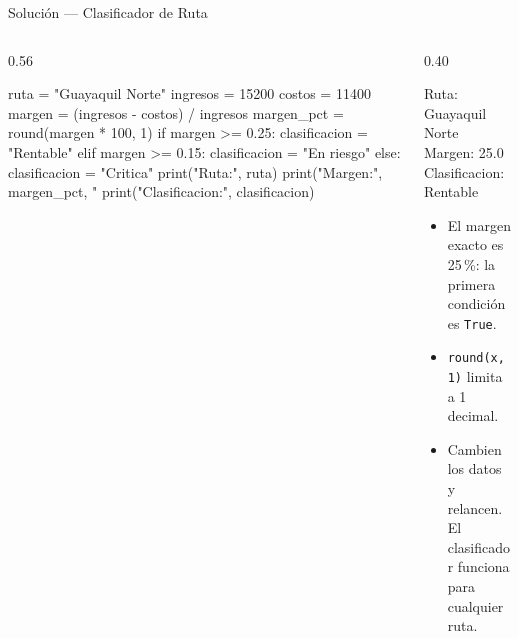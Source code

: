 \documentclass[aspectratio=169, 11pt]{beamer}
\begin{document}
\begin{frame}[fragile,shrink=30]{Solución --- Clasificador de Ruta}
  \vspace{-6pt}
  \begin{columns}[T]
    \begin{column}{0.56\textwidth}
      \begin{pyblock}
ruta     = "Guayaquil Norte"
ingresos = 15200
costos   = 11400
margen     = (ingresos - costos) / ingresos
margen_pct = round(margen * 100, 1)
if margen >= 0.25:
    clasificacion = "Rentable"
elif margen >= 0.15:
    clasificacion = "En riesgo"
else:
    clasificacion = "Critica"
print("Ruta:", ruta)
print("Margen:", margen_pct, "%
print("Clasificacion:", clasificacion)
      \end{pyblock}
    \end{column}

    \begin{column}{0.40\textwidth}
      \vspace{4pt}
      \begin{outputblock}
Ruta: Guayaquil Norte
Margen: 25.0 %
Clasificacion: Rentable
      \end{outputblock}

      \vspace{6pt}
      {\footnotesize\color{textMuted}
      \begin{itemize}\setlength{\itemsep}{4pt}
        \item[{\color{codeGreen}\scriptsize\faCheck}]
          El margen exacto es 25\,\%:
          la primera condición es \texttt{True}.
        \item[{\color{codeGreen}\scriptsize\faCheck}]
          \texttt{round(x, 1)} limita a 1 decimal.
        \item[{\color{arcaRed}\scriptsize\faLightbulb}]
          Cambien los datos y relancen.
          El clasificador funciona para
          cualquier ruta.
      \end{itemize}
      }
    \end{column}
  \end{columns}
\end{frame}
\end{document}

